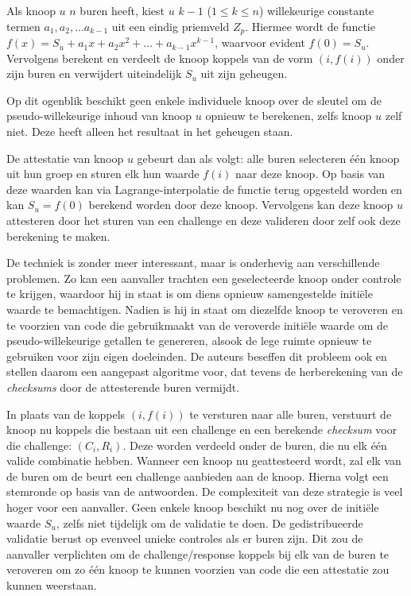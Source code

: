 Als knoop $u$ $n$ buren heeft, kiest $u$ $k - 1$ ($1 \leq k \leq n$)
willekeurige constante termen $a_1, a_2,\dots a_{k-1}$ uit een eindig priemveld
$Z_p$. Hiermee wordt de functie $f(x) = S_u + a_1 x+a_2 x^2 +\dots + a_{k-1}
x^{k-1}$, waarvoor evident $f(0) = S_u$. Vervolgens berekent en verdeelt de
knoop koppels van de vorm $(i,f(i))$ onder zijn buren en verwijdert
uiteindelijk $S_u$ uit zijn geheugen.

Op dit ogenblik beschikt geen enkele individuele knoop over de sleutel om de
pseudo-willekeurige inhoud van knoop $u$ opnieuw te berekenen, zelfs knoop $u$
zelf niet. Deze heeft alleen het resultaat in het geheugen staan.

De attestatie van knoop $u$ gebeurt dan als volgt: alle buren selecteren
\'e\'en knoop uit hun groep en sturen elk hun waarde $f(i)$ naar deze knoop. Op
basis van deze waarden kan via Lagrange-interpolatie de functie terug opgesteld
worden en kan $S_u = f(0)$ berekend worden door deze knoop. Vervolgens kan deze
knoop $u$ attesteren door het sturen van een challenge en deze valideren door
zelf ook deze berekening te maken.

De techniek is zonder meer interessant, maar is onderhevig aan verschillende
problemen. Zo kan een aanvaller trachten een geselecteerde knoop onder controle
te krijgen, waardoor hij in staat is om diens opnieuw samengestelde initi\"ele
waarde te bemachtigen. Nadien is hij in staat om diezelfde knoop te veroveren
en te voorzien van code die gebruikmaakt van de veroverde initi\"ele waarde om
de pseudo-willekeurige getallen te genereren, alsook de lege ruimte opnieuw te
gebruiken voor zijn eigen doeleinden. De auteurs beseffen dit probleem ook en
stellen daarom een aangepast algoritme voor, dat tevens de herberekening van de
\emph{checksums} door de attesterende buren vermijdt.

In plaats van de koppels $(i, f(i))$ te versturen naar alle buren, verstuurt de
knoop nu koppels die bestaan uit een challenge en een berekende \emph{checksum}
voor die challenge: $(C_i,R_i)$. Deze worden verdeeld onder de buren, die nu
elk \'e\'en valide combinatie hebben. Wanneer een knoop nu geattesteerd wordt,
zal elk van de buren om de beurt een challenge aanbieden aan de knoop. Hierna
volgt een stemronde op basis van de antwoorden. De complexiteit van deze
strategie is veel hoger voor een aanvaller. Geen enkele knoop beschikt nu nog
over de initi\"ele waarde $S_u$, zelfs niet tijdelijk om de validatie te doen.
De gedistribueerde validatie berust op evenveel unieke controles als er buren
zijn. Dit zou de aanvaller verplichten om de challenge/response koppels bij elk
van de buren te veroveren om zo \'e\'en knoop te kunnen voorzien van code die
een attestatie zou kunnen weerstaan.

